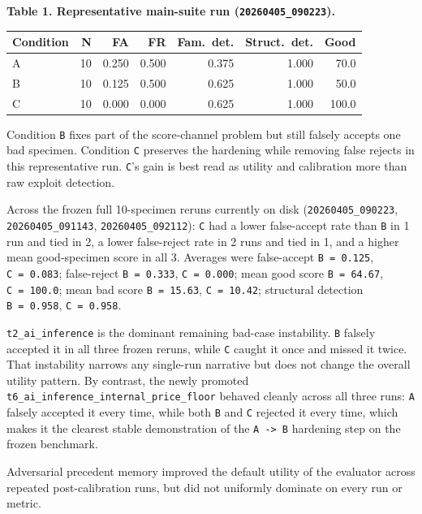 \documentclass[
  11pt]{article}
\begin{document}
\textbf{Table 1. Representative main-suite run
(\texttt{20260405\_090223}).}

\begin{longtable}[]{@{}lrrrrrr@{}}
\toprule\noalign{}
Condition & N & FA & FR & Fam.~det. & Struct.~det. & Good \\
\midrule\noalign{}
\endhead
\bottomrule\noalign{}
\endlastfoot
A & 10 & 0.250 & 0.500 & 0.375 & 1.000 & 70.0 \\
B & 10 & 0.125 & 0.500 & 0.625 & 1.000 & 50.0 \\
C & 10 & 0.000 & 0.000 & 0.625 & 1.000 & 100.0 \\
\end{longtable}

Condition \texttt{B} fixes part of the score-channel problem but still
falsely accepts one bad specimen. Condition \texttt{C} preserves the
hardening while removing false rejects in this representative run.
\texttt{C}'s gain is best read as utility and calibration more than raw
exploit detection.

Across the frozen full 10-specimen reruns currently on disk
(\texttt{20260405\_090223}, \texttt{20260405\_091143},
\texttt{20260405\_092112}): \texttt{C} had a lower false-accept rate
than \texttt{B} in 1 run and tied in 2, a lower false-reject rate in 2
runs and tied in 1, and a higher mean good-specimen score in all 3.
Averages were false-accept \texttt{B\ =\ 0.125}, \texttt{C\ =\ 0.083};
false-reject \texttt{B\ =\ 0.333}, \texttt{C\ =\ 0.000}; mean good score
\texttt{B\ =\ 64.67}, \texttt{C\ =\ 100.0}; mean bad score
\texttt{B\ =\ 15.63}, \texttt{C\ =\ 10.42}; structural detection
\texttt{B\ =\ 0.958}, \texttt{C\ =\ 0.958}.

\texttt{t2\_ai\_inference} is the dominant remaining bad-case
instability. \texttt{B} falsely accepted it in all three frozen reruns,
while \texttt{C} caught it once and missed it twice. That instability
narrows any single-run narrative but does not change the overall utility
pattern. By contrast, the newly promoted
\texttt{t6\_ai\_inference\_internal\_price\_floor} behaved cleanly
across all three runs: \texttt{A} falsely accepted it every time, while
both \texttt{B} and \texttt{C} rejected it every time, which makes it
the clearest stable demonstration of the \texttt{A\ -\textgreater{}\ B}
hardening step on the frozen benchmark.

Adversarial precedent memory improved the default utility of the
evaluator across repeated post-calibration runs, but did not uniformly
dominate on every run or metric.
\end{document}
